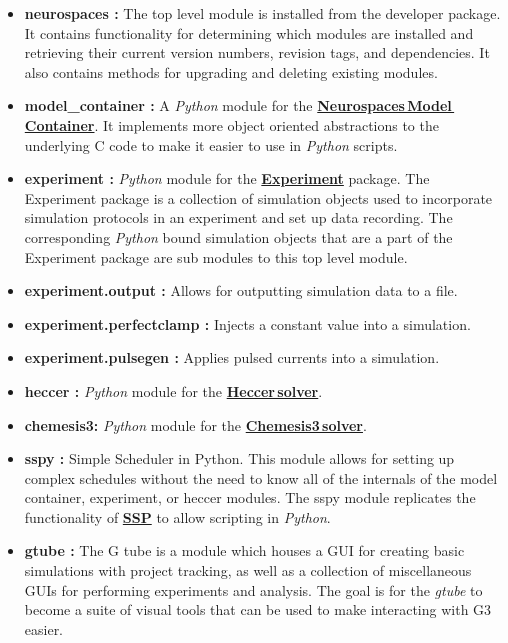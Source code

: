 \documentclass[12pt]{article}
\begin{document}
\begin{itemize}

\item[] {\bf neurospaces :}  The top level module is installed from the developer package. It contains functionality for determining which modules are installed and retrieving their current version numbers, revision tags, and dependencies. It also contains methods for upgrading and deleting existing modules. 

\item[] {\bf model\_container :} A {\it Python} module for the \href{../model-container/model-container.tex}{\bf Neurospaces\,Model\,Container}. It implements more object oriented abstractions to the underlying C code to make it easier to use in {\it Python} scripts.

\item[]{\bf experiment :}  {\it Python} module for the \href{../experiment/experiment.tex}{\bf Experiment} package. The Experiment package is a collection of simulation objects used to incorporate simulation protocols in an experiment and set up data recording. The corresponding {\it Python} bound simulation objects that are a part of the Experiment package are sub modules to this top level module.

\item[]{\bf experiment.output :} Allows for outputting simulation data to a file.

\item[]{\bf experiment.perfectclamp :} Injects a constant value into a simulation.

\item[]{\bf experiment.pulsegen :} Applies pulsed currents into a simulation.

\item[]{\bf heccer :} {\it Python} module for the \href{../heccer/heccer.tex}{\bf Heccer\,solver}. 

\item[]{\bf chemesis3:} {\it Python} module for the \href{../chemesis-3-log/chemesis-3-log.tex}{\bf Chemesis3\,solver}. 

\item []{\bf sspy :} Simple Scheduler in Python. This module allows for setting up complex schedules without the need to know all of the internals of the model container, experiment, or heccer modules. The sspy module replicates the functionality of \href{../ssp/ssp.tex}{\bf SSP} to allow scripting in {\it Python}.

\item[]{\bf gtube :} The G tube is a module which houses a GUI for creating basic simulations with project tracking, as well as a collection of miscellaneous GUIs for performing experiments and analysis. The goal is for the {\it gtube} to become a suite of visual tools that can be used to make interacting with G3 easier.

\end{itemize}
    
\end{document}
